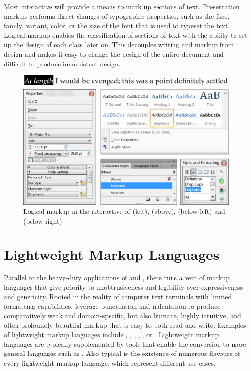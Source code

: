 \documentclass{book}
\begin{document}
Most interactive  will provide a means to mark up sections of text.
Presentation markup performs direct changes of typographic properties, such as
the face, family, variant, color, or the size of the font that is used to
typeset the text. Logical markup enables the classification of sections of text
with the ability to set up the design of each class later on. This decouples
writing and markup from design and makes it easy to change the design of the
entire document and difficult to produce inconsistent design.

\begin{figure}
  \includegraphics[width=\textwidth]{examples/02/interactive-editors.png}
  \caption{Logical markup in the interactive  of 
    (left),  (above),  (below left) and
     (below right)}
\end{figure}

\section{Lightweight Markup Languages}
Parallel to the heavy-duty applications of  and ,
there runs a vein of markup languages that give priority to unobtrusiveness and
legibility over expressiveness and genericity. Rooted in the reality of
computer text terminals with limited formatting capabilities,  leverage punctuation and
indentation to produce comparatively weak and domain-specific, but also humane,
highly intuitive, and often profoundly beautiful markup that is easy to both
read and write. Examples of lightweight markup languages include ,
, , , , or .
Lightweight markup languages are typically supplemented by tools that enable
the conversion to more general languages such as . Also typical
is the existence of numerous flavours of every lightweight markup language,
which represent different use cases.
\end{document}
